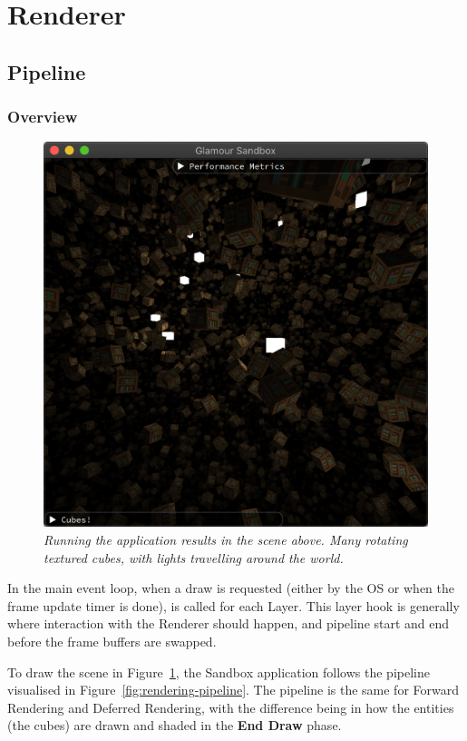 \section{Renderer}\label{sec:renderer}

\subsection{Pipeline}

\subsubsection{Overview}

\begin{figure}[h!]
  \begin{center}
    \includegraphics[width=0.6\columnwidth]{../sandbox.png}
  \end{center}
  \caption[Sandbox screenshot]{
    \emph{
      Running the application results in the scene above.
      Many rotating textured cubes, with lights travelling around the world.
    }
  }\label{fig:sandbox-screenshot}
\end{figure}

In the main event loop, when a draw is requested (either by the OS or when the frame update timer is done),  is called for each Layer.
This layer hook is generally where interaction with the Renderer should happen, and pipeline start and end before the frame buffers are swapped.

To draw the scene in Figure~\ref{fig:sandbox-screenshot}, the Sandbox application follows the pipeline visualised in Figure~\ref{fig:rendering-pipeline}.
The pipeline is the same for Forward Rendering and Deferred Rendering, with the difference being in how the entities (the cubes) are drawn and shaded in the \textbf{End Draw} phase.

